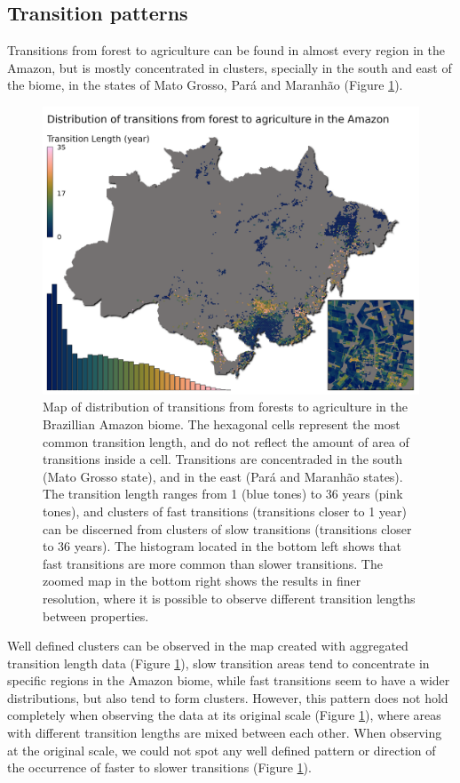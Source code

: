 \documentclass[essd, manuscript]{copernicus}
\begin{document}
\subsection{Transition patterns}

Transitions from forest to agriculture can be found in almost every region in the Amazon, but is mostly concentrated in clusters, specially in the south and east of the biome, in the states of Mato Grosso, Pará and Maranhão (Figure \ref{fig:map-plot}).

\begin{figure}[ht]
\includegraphics[width=17cm]{figs/map} \caption{Map of distribution of transitions from forests to agriculture in the Brazillian Amazon biome. The hexagonal cells represent the most common transition length, and do not reflect the amount of area of transitions inside a cell. Transitions are concentraded in the south (Mato Grosso state), and in the east (Pará and Maranhão states). The transition length ranges from 1 (blue tones) to 36 years (pink tones), and clusters of fast transitions (transitions closer to 1 year) can be discerned from clusters of slow transitions (transitions closer to 36 years). The histogram located in the bottom left shows that fast transitions are more common than slower transitions. The zoomed map in the bottom right shows the results in finer resolution, where it is possible to observe different transition lengths between properties.}\label{fig:map-plot}
\end{figure}

Well defined clusters can be observed in the map created with aggregated transition length data (Figure \ref{fig:map-plot}), slow transition areas tend to concentrate in specific regions in the Amazon biome, while fast transitions seem to have a wider distributions, but also tend to form clusters.
However, this pattern does not hold completely when observing the data at its original scale (Figure \ref{fig:map-plot}), where areas with different transition lengths are mixed between each other.
When observing at the original scale, we could not spot any well defined pattern or direction of the occurrence of faster to slower transitions (Figure \ref{fig:map-plot}).
\end{document}
